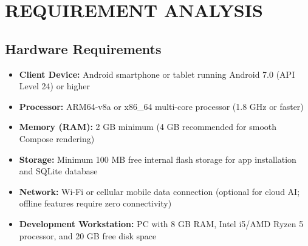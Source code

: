 \documentclass[a4paper,12pt]{report}
\begin{document}
\chapter{REQUIREMENT ANALYSIS}

\section{Hardware Requirements}
\begin{itemize}
    \item \textbf{Client Device:} Android smartphone or tablet running Android 7.0 (API Level 24) or higher
    \item \textbf{Processor:} ARM64-v8a or x86\_64 multi-core processor (1.8 GHz or faster)
    \item \textbf{Memory (RAM):} 2 GB minimum (4 GB recommended for smooth Compose rendering)
    \item \textbf{Storage:} Minimum 100 MB free internal flash storage for app installation and SQLite database
    \item \textbf{Network:} Wi-Fi or cellular mobile data connection (optional for cloud AI; offline features require zero connectivity)
    \item \textbf{Development Workstation:} PC with 8 GB RAM, Intel i5/AMD Ryzen 5 processor, and 20 GB free disk space
\end{itemize}
\end{document}
